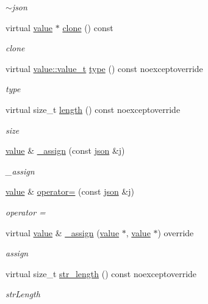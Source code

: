\begin{DoxyCompactItemize}
\begin{DoxyCompactList}\small\item\em $\sim$json \end{DoxyCompactList}\item 
virtual \hyperlink{classformat_1_1value_aa6b85823936bf7b8ab78d3f8d443c00d}{value} $\ast$ \hyperlink{classformat_1_1json_a49534b733831b2dae879d7407f7cfba5}{clone} () const 
\begin{DoxyCompactList}\small\item\em clone \end{DoxyCompactList}\item 
virtual \hyperlink{classformat_1_1value_aa0334be06389a7b14af485fa0cd3aa21}{value\+::value\+\_\+t} \hyperlink{classformat_1_1json_a970027799aac71bf99e3f1d7264364dc}{type} () const noexceptoverride
\begin{DoxyCompactList}\small\item\em type \end{DoxyCompactList}\item 
virtual size\+\_\+t \hyperlink{classformat_1_1json_a792f3755d148f250ae60e4bbb35fbc6b}{length} () const noexceptoverride
\begin{DoxyCompactList}\small\item\em size \end{DoxyCompactList}\item 
\hyperlink{classformat_1_1value_aa6b85823936bf7b8ab78d3f8d443c00d}{value} \& \hyperlink{classformat_1_1json_a5bc59d792602f7c7f4211db5dfd67267}{\+\_\+assign} (const \hyperlink{classformat_1_1json}{json} \&j)
\begin{DoxyCompactList}\small\item\em \+\_\+assign \end{DoxyCompactList}\item 
\hyperlink{classformat_1_1value_aa6b85823936bf7b8ab78d3f8d443c00d}{value} \& \hyperlink{classformat_1_1json_a529a9a8bee8ae66f0cfd9757dd6744db}{operator=} (const \hyperlink{classformat_1_1json}{json} \&j)
\begin{DoxyCompactList}\small\item\em operator = \end{DoxyCompactList}\item 
virtual \hyperlink{classformat_1_1value_aa6b85823936bf7b8ab78d3f8d443c00d}{value} \& \hyperlink{classformat_1_1json_a331d385e55541671d431d5e5167e8c90}{\+\_\+assign} (\hyperlink{classformat_1_1value_aa6b85823936bf7b8ab78d3f8d443c00d}{value} $\ast$, \hyperlink{classformat_1_1value_aa6b85823936bf7b8ab78d3f8d443c00d}{value} $\ast$) override
\begin{DoxyCompactList}\small\item\em assign \end{DoxyCompactList}\item 
virtual size\+\_\+t \hyperlink{classformat_1_1json_a1110e453dd28d55ed9b6b196d04d1c7e}{str\+\_\+length} () const noexceptoverride
\begin{DoxyCompactList}\small\item\em str\+Length \end{DoxyCompactList}\end{DoxyCompactItemize}
